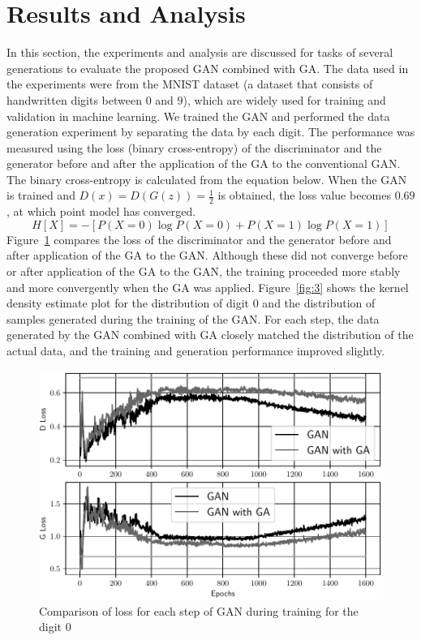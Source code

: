 \section{Results and Analysis}
\label{sec:results}
In this section, the experiments and analysis are discussed for tasks of several generations to evaluate the proposed GAN combined with GA. The data used in the experiments were from the MNIST dataset (a dataset that consists of handwritten digits between \(0\) and \(9\)), which are widely used for training and validation in machine learning. We trained the GAN and performed the data generation experiment by separating the data by each digit. The performance was measured using the loss (binary cross-entropy) of the discriminator and the generator before and after the application of the GA to the conventional GAN. The binary cross-entropy is calculated from the equation below. When the GAN is trained and \(D\left(x\right)=D\left(G\left(z\right)\right) = \frac{1}{2}\) is obtained, the loss value becomes \(0.69\), at which point model has converged.
\begin{equation}
    H\left[X\right] = -\left[P\left(X=0\right)\log{P\left(X=0\right) + P\left(X=1\right)\log{P\left(X=1\right)}}\right]
\end{equation}
Figure~\ref{fig:2} compares the loss of the discriminator and the generator before and after application of the GA to the GAN. Although these did not converge before or after application of the GA to the GAN, the training proceeded more stably and more convergently when the GA was applied. Figure~\ref{fig:3} shows the kernel density estimate plot for the distribution of digit \(0\) and the distribution of samples generated during the training of the GAN. For each step, the data generated by the GAN combined with GA closely matched the distribution of the actual data, and the training and generation performance improved slightly.
\begin{figure}[t]
\centering
\includegraphics[width=\columnwidth]{figure-2}
\caption{Comparison of loss for each step of GAN during training for the digit \(0\)}
\label{fig:2}
\end{figure}

